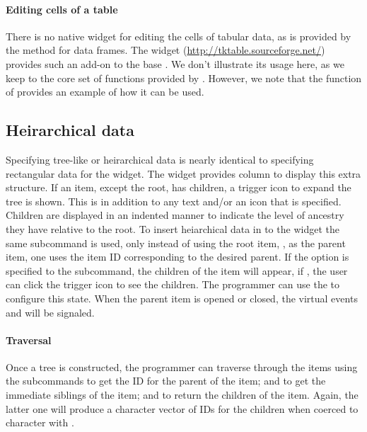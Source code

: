 \paragraph{Editing cells of a table}
There is no native widget for editing the cells of tabular data, as is provided by the  method for data frames. The  widget (\url{http://tktable.sourceforge.net/}) provides
such an add-on to the base \TK. We don't illustrate its usage here, as we keep to the core set of functions provided by \TK. However, we note that the  function of  provides an example of how it can be used.



\subsection{Heirarchical data}

Specifying tree-like or heirarchical data is nearly identical to
specifying rectangular data for the  widget.  The
widget provides column  to display this extra structure. If
an item, except the root, has children, a trigger icon to expand the
tree is shown. This is in addition to any text and/or an icon that is
specified. Children are displayed in an indented manner to indicate
the level of ancestry they have relative to the root.  To insert
heiarchical data in to the widget the same
 subcommand is used, only instead of
using the root item, \qcode{}, as the parent item, one uses the item
ID corresponding to the desired parent. If the option 
is specified to the  subcommand, the children of the item
will appear, if , the user can click the trigger icon to
see the children. The programmer can use the
 to configure this state. When the
parent item is opened or closed, the virtual events
 and  will be
signaled.



\paragraph{Traversal}
Once a tree is constructed, the programmer can traverse
through the items using the subcommands
 to get the ID for the parent of the
item;  and
 to get the immediate siblings of the
item; and  to return the children of
the item. Again, the latter one will produce a character vector of  IDs for the
children when coerced to character with .



